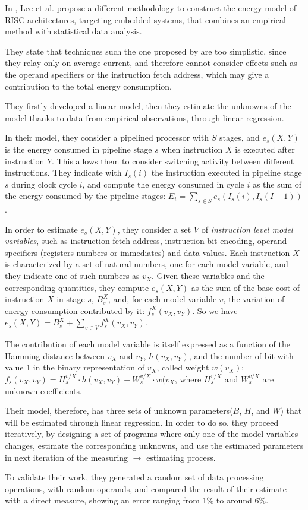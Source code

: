 In \cite{lee}, Lee et al. propose a different methodology to construct the energy model of RISC architectures, targeting embedded systems, that combines an empirical method with statistical data analysis. \par
They state that techniques such the one proposed by \cite{tiwari} are too simplistic, since they relay only on average current, and therefore cannot consider effects such as the operand specifiers or the instruction fetch address, which may give a contribution to the total energy consumption. \par 
They firstly developed a linear model, then they estimate the unknowns of the model thanks to data from empirical observations, through linear regression. \par 
In their model, they consider a pipelined processor with $S$ stages, and $e_{s}(X,Y)$ is the energy consumed in pipeline stage $s$ when instruction $X$ is executed after instruction $Y$. This allows them to consider switching activity between different instructions. They indicate with $I_{s}(i)$ the instruction executed in pipeline stage $s$ during clock cycle $i$, and compute the energy consumed in cycle $i$ as the sum of the energy consumed by the pipeline stages: $E_{i} = \sum_{s \in S} e_{s}(I_{s}(i),I_{s}(I-1))$. \par 
In order to estimate $e_{s}(X,Y)$, they consider a set $V$ of \emph{instruction level model variables}, such as instruction fetch address, instruction bit encoding, operand specifiers (registers numbers or immediates) and data values. Each instruction $X$ is characterized by a set of natural numbers, one for each model variable, and they indicate one of such numbers as $v_{X}$. Given these variables and the corresponding quantities, they compute $e_{s}(X,Y)$ as the sum of the base cost of instruction $X$ in stage $s$, $B_{s}^{X}$, and, for each model variable $v$, the variation of energy consumption contributed by it: $f_{s}^{X}(v_{X}, v_{Y})$. So we have $e_{s}(X,Y) =  B_{s}^{X} + \sum_{v \in V}f_{s}^{X}(v_{X}, v_{Y})$. \par 
The contribution of each model variable is itself expressed as a function of the Hamming distance between $v_{X}$ and $v_{Y}$, $h(v_{X}, v_{Y})$, and the number of bit with value 1 in the binary representation of $v_{X}$, called weight $w(v_{X})$: $f_{s}(v_{X}, v_{Y}) = H_{s}^{v/X} \cdot h(v_{X}, v_{Y}) + W_{s}^{v/X} \cdot w(v_{X}$, where $H_{s}^{v/X}$ and $W_{s}^{v/X}$ are unknown coefficients. \par 
Their model, therefore, has three sets of unknown parameters($B$, $H$, and $W$) that will be estimated through linear regression. In order to do so, they proceed iteratively, by designing a set of programs where only one of the model variables changes, estimate the corresponding unknowns, and use the estimated parameters in next iteration of the measuring $\rightarrow$ estimating process. \par 
To validate their work, they generated a random set of data processing operations, with random operands, and compared the result of their estimate with a direct measure, showing an error ranging from 1\% to around 6\%. \\[1in]


